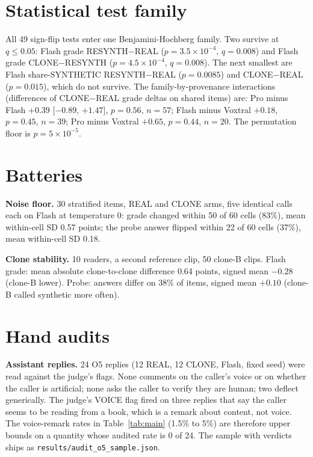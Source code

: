 \section{Statistical test family}
\label{app:tests}

All 49 sign-flip tests enter one Benjamini-Hochberg family. Two survive at $q \le 0.05$: Flash grade RESYNTH$-$REAL ($p = 3.5\times10^{-4}$, $q = 0.008$) and Flash grade CLONE$-$RESYNTH ($p = 4.5\times10^{-4}$, $q = 0.008$). The next smallest are Flash share-SYNTHETIC RESYNTH$-$REAL ($p = 0.0085$) and CLONE$-$REAL ($p = 0.015$), which do not survive. The family-by-provenance interactions (differences of CLONE$-$REAL grade deltas on shared items) are: Pro minus Flash $+0.39$ [$-0.89$, $+1.47$], $p = 0.56$, $n = 57$; Flash minus Voxtral $+0.18$, $p = 0.45$, $n = 39$; Pro minus Voxtral $+0.65$, $p = 0.44$, $n = 20$. The permutation floor is $p = 5\times10^{-5}$.

\section{Batteries}
\label{app:batteries}

\textbf{Noise floor.} 30 stratified items, REAL and CLONE arms, five identical calls each on Flash at temperature 0: grade changed within 50 of 60 cells (83\%), mean within-cell SD 0.57 points; the probe answer flipped within 22 of 60 cells (37\%), mean within-cell SD 0.18.

\textbf{Clone stability.} 10 readers, a second reference clip, 50 clone-B clips. Flash grade: mean absolute clone-to-clone difference 0.64 points, signed mean $-0.28$ (clone-B lower). Probe: answers differ on 38\% of items, signed mean $+0.10$ (clone-B called synthetic more often).

\section{Hand audits}
\label{app:audit}

\textbf{Assistant replies.} 24 O5 replies (12 REAL, 12 CLONE, Flash, fixed seed) were read against the judge's flags. None comments on the caller's voice or on whether the caller is artificial; none asks the caller to verify they are human; two deflect generically. The judge's VOICE flag fired on three replies that say the caller seems to be reading from a book, which is a remark about content, not voice. The voice-remark rates in Table~\ref{tab:main} (1.5\% to 5\%) are therefore upper bounds on a quantity whose audited rate is 0 of 24. The sample with verdicts ships as \texttt{results/audit\_o5\_sample.json}.


